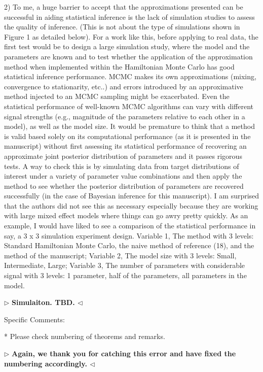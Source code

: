 \documentclass[12pt]{article}
\newenvironment{reply}{$\triangleright$\bfseries}{$\triangleleft$}
\begin{document}
2) To me, a huge barrier to accept that the approximations presented can be successful in aiding statistical inference is the lack of simulation studies to assess the quality of inference. (This is not about the type of simulations shown in Figure 1 as detailed below). For a work like this, before applying to real data, the first test would be to design a large simulation study, where the model and the parameters are known and to test whether the application of the approximation method when implemented within the Hamiltonian Monte Carlo has good statistical inference performance. MCMC makes its own approximations (mixing, convergence to stationarity, etc..) and errors introduced by an approximative method injected to an MCMC sampling might be exacerbated. Even the statistical performance of well-known MCMC algorithms can vary with different signal strengths (e.g., magnitude of the parameters relative to each other in a model), as well as the model size. It would be premature to think that a method is valid based solely on its computational performance (as it is presented in the manuscript) without first assessing its statistical performance of recovering an approximate joint posterior distribution of parameters and it passes rigorous tests. A way to check this is by simulating data from target distributions of interest under a variety of parameter value combinations and then apply the method to see whether the posterior distribution of parameters are recovered successfully (in the case of Bayesian inference for this manuscript). I am surprised that the authors did not see this as necessary especially because they are working with large mixed effect models where things can go awry pretty quickly. As an example, I would have liked to see a comparison of the statistical performance in say, a 3 x 3 simulation experiment design. Variable 1, The method with 3 levels: Standard Hamiltonian Monte Carlo, the naive method of reference (18), and the method of the manuscript; Variable 2, The model size with 3 levels: Small, Intermediate, Large; Variable 3, The number of parameters with considerable signal with 3 levels: 1 parameter, half of the parameters, all parameters in the model. 


\begin{reply}
Simulaiton. TBD.
\end{reply}

Specific Comments: 

* Please check numbering of theorems and remarks. 

\begin{reply}
	Again, we thank you for catching this error and have fixed the numbering accordingly. 
\end{reply}
\end{document}

